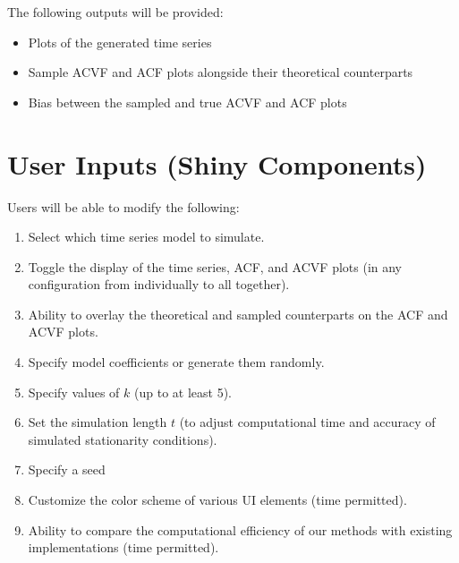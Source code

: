 \documentclass[11pt]{article}
\begin{document}
\newpage

\noindent The following outputs will be provided:
\begin{itemize}
    \item Plots of the generated time series
    \item Sample ACVF and ACF plots alongside their theoretical counterparts
    \item Bias between the sampled and true ACVF and ACF plots
\end{itemize}

\section{User Inputs (Shiny Components)}

Users will be able to modify the following:
\begin{enumerate}
    \item Select which time series model to simulate.
    
    \item Toggle the display of the time series, ACF, and ACVF plots (in any configuration from individually to all together).

    \item Ability to overlay the theoretical and sampled counterparts on the ACF and ACVF plots.

    \item Specify model coefficients or generate them randomly.

    \item Specify values of $k$ (up to at least 5).

    \item Set the simulation length $t$ (to adjust computational time and accuracy of simulated stationarity conditions).

    \item Specify a seed

    \item Customize the color scheme of various UI elements (time permitted).

    \item Ability to compare the computational efficiency of our methods with existing implementations (time permitted).
\end{enumerate}

\nocite{tidyverse}
\nocite{shiny}
\nocite{tseries}
\nocite{testthat}



\end{document}
